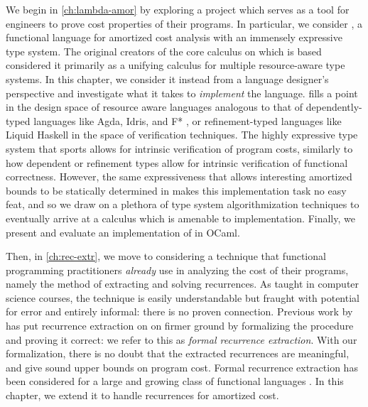 
We begin in \autoref{ch:lambda-amor} by exploring a project which serves as a tool for engineers to prove cost properties of their programs. In particular, we consider \lambdaamorimpl, a functional language for amortized cost analysis with an immensely expressive type system. The original creators of the core calculus on which \lambdaamorimpl is based \cite{rajan-et-al:popl21} considered it primarily as a unifying calculus for multiple resource-aware type systems. In this chapter, we consider it instead from a language designer's perspective and investigate what it takes to \textit{implement} the language. \lambdaamorimpl fills a point in the design space of resource aware languages analogous to that of dependently-typed languages like Agda, Idris, and F* \citehere, or refinement-typed languages like Liquid Haskell \citehere in the space of verification techniques. The highly expressive type system that \lambdaamorimpl sports allows for intrinsic verification \citehere of program costs, similarly to how dependent or refinement types allow for intrinsic verification of functional correctness. However, the same expressiveness that allows interesting amortized bounds to be statically determined in \lambdaamorimpl makes this implementation task no easy feat, and so we draw on a plethora of type system algorithmization techniques to eventually arrive at a calculus which is amenable to implementation. Finally, we present and evaluate an implementation of \lambdaamorimpl in OCaml.

Then, in \autoref{ch:rec-extr}, we move to considering a technique that functional programming practitioners \textit{already} use in analyzing the cost of their programs, namely the method of extracting and solving recurrences. As taught in computer science courses, the technique is easily understandable but fraught with potential for error and entirely informal: there is no proven connection. Previous work by \citet{danner-et-al:plpv13} \cite{danner-et-al:icfp15} has put recurrence extraction on on firmer ground by formalizing the procedure and proving it correct: we refer to this as \textit{formal recurrence extraction}. With our formalization, there is no doubt that the extracted recurrences are meaningful, and give sound upper bounds on program cost. Formal recurrence extraction has been considered for a large and growing class of functional languages \cite{kavvos-et-al:popl20} . In this chapter, we extend it to handle recurrences for amortized cost.


